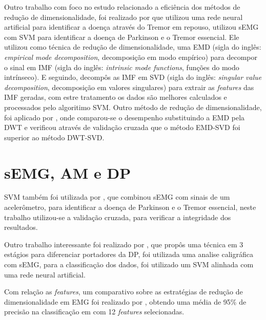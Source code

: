 Outro trabalho com foco no estudo relacionado a eficiência dos métodos de redução de dimensionalidade, foi realizado por  que utilizou uma rede neural artificial para identificar a doença através do Tremor em repouso,  utilizou sEMG com SVM para identificar a doença de Parkinson e o Tremor essencial. Ele utilizou como técnica de redução de dimensionalidade, uma EMD (sigla do inglês: \textit{empirical mode decomposition}, decomposição em modo empírico) para decompor o sinal em IMF (sigla do inglês: \textit{intrinsic mode functions}, funções do modo intrínseco). E seguindo, decompôs as IMF em SVD (sigla do inglês: \textit{singular value decomposition}, decomposição em valores singulares) para extrair as \textit{features} das IMF geradas, com estre tratamento os dados são melhores calculados e processados pelo algoritimo SVM. Outro método de redução de dimensionalidade, foi aplicado por , onde comparou-se o desempenho substituindo a EMD pela DWT e verificou através de validação cruzada que o método EMD-SVD foi superior ao método DWT-SVD.

\section{sEMG, AM e DP}
SVM também foi utilizada por \cite{kugler2013automated}, que combinou sEMG com sinais de um acelerômetro, para identificar a doença de Parkinson e o Tremor essencial, neste trabalho utilizou-se a validação cruzada, para verificar a integridade dos resultados.

Outro trabalho interessante foi realizado por \cite{loconsole2018model}, que propôs uma técnica em 3 estágios para diferenciar portadores da DP, foi utilizada uma analise caligráfica com sEMG, para a classificação dos dados, foi utilizado um SVM alinhada com uma rede neural artificial.

Com relação as \textit{features}, um comparativo sobre as estratégias de redução de dimensionalidade em EMG foi realizado por \cite{liu2014feature}, obtendo uma média de 95\% de precisão na classificação em com 12 \textit{features} selecionadas. 